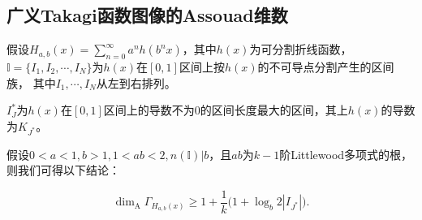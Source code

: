 \subsection{广义Takagi函数图像的Assouad维数}

假设$H_{a,b}(x)=\sum_{n=0}^\infty a^nh(b^nx)$，其中$h(x)$为可分割折线函数，
$\mathbb{I}=\{I_1,I_2,\cdots,I_N\}$为$h(x)$在$[0,1]$区间上按$h(x)$的不可导点分割产生的区间族，
其中$I_1,\cdots,I_N$从左到右排列。

$I_J^*$为$h(x)$在$[0,1]$区间上的导数不为$0$的区间长度最大的区间，其上$h(x)$的导数为$K_{J^*}$。

假设$0<a<1,b>1,1<ab<2,n(\mathbb{I})|b$，且$ab$为$k-1$阶Littlewood多项式的根，则我们可得以下结论：

$$
      \mathrm{\dim_A}\Gamma_{H_{a,b}(x)}\ge1+\frac{1}{k}\Big(1+\log_b2|I_{J^*}|\Big).
$$

